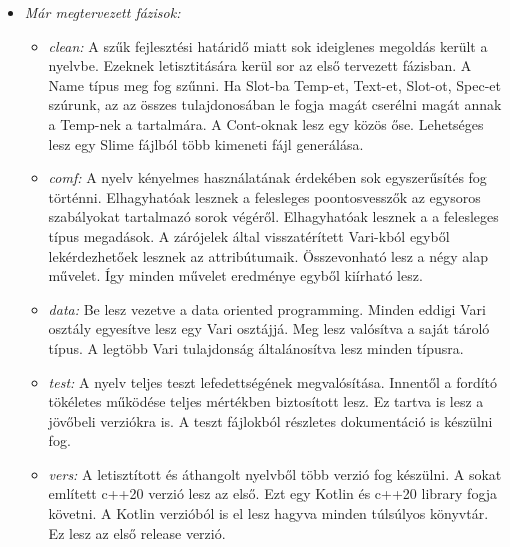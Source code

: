 {\begin{itemize}
\item \emph{Már megtervezett fázisok:}
\begin{itemize}
\item \emph{clean:}
A szűk fejlesztési határidő miatt sok ideiglenes megoldás került a nyelvbe.
Ezeknek letisztitására kerül sor az első tervezett fázisban.
A Name típus meg fog szűnni.
Ha Slot-ba Temp-et, Text-et, Slot-ot, Spec-et szúrunk, az az összes tulajdonosában le fogja magát cserélni magát annak a Temp-nek a tartalmára.
A Cont-oknak lesz egy közös őse. 
Lehetséges lesz egy Slime fájlból több kimeneti fájl generálása.
\item \emph{comf:}
A nyelv kényelmes használatának érdekében sok egyszerűsítés fog történni.
Elhagyhatóak lesznek a felesleges poontosvesszők az egysoros szabályokat tartalmazó sorok végéről.
Elhagyhatóak lesznek a a felesleges típus megadások.
A zárójelek által visszatérített Vari-kból egyből lekérdezhetőek lesznek az attribútumaik. 
Összevonható lesz a négy alap művelet.
Így minden művelet eredménye egyből kiírható lesz.
\item \emph{data:}
Be lesz vezetve a data oriented programming.
Minden eddigi Vari osztály egyesítve lesz egy Vari osztájjá.
Meg lesz valósítva a saját tároló típus.
A legtöbb Vari tulajdonság általánosítva lesz minden típusra.
\item \emph{test:}
A nyelv teljes teszt lefedettségének megvalósítása.
Innentől a fordító tökéletes működése teljes mértékben biztosított lesz.
Ez tartva is lesz a jövőbeli verziókra is. 
A teszt fájlokból részletes dokumentáció is készülni fog.
\item \emph{vers:}
A letisztított és áthangolt nyelvből több verzió fog készülni.
A sokat említett c++20 verzió lesz az első.
Ezt egy Kotlin és c++20 library fogja követni.
A Kotlin verzióból is el lesz hagyva minden túlsúlyos könyvtár.
Ez lesz az első release verzió.
\end{itemize}


\end{itemize}}
